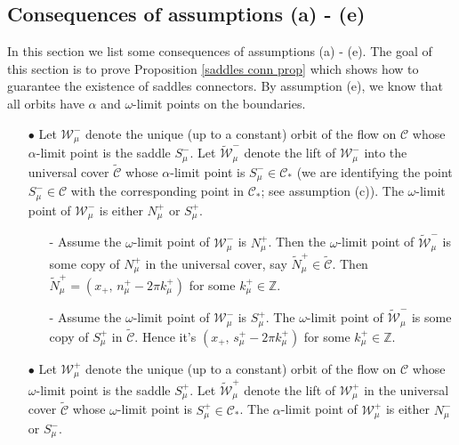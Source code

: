 \documentclass[11 pt]{article}
\renewcommand\({\left(}
\renewcommand\){\right)}
\newcommand\wt{\widetilde}
\newcommand\<{\langle}
\renewcommand\>{\rangle}
\newcommand\8{\infty}
\renewcommand\a{\alpha}
\newcommand{\mc}{\mathcal}
\newcommand{\Z}{\mathbb{Z}}
\begin{document}
\subsection{Consequences of assumptions (a) - (e)} 

\medskip
\medskip

In this section we list some consequences of assumptions (a) - (e). The goal of this section is to prove Proposition \ref{saddles conn prop} which shows how to guarantee the existence of saddles connectors. By assumption (e), we know that all orbits have $\a$ and $\omega$-limit points on the boundaries.

\medskip
\medskip

\begin{itemize}

\item [$\bullet$] Let $\mc{W}^-_\mu$ denote the unique (up to a constant) orbit of the flow on $\mc{C}$ whose $\alpha$-limit point is the saddle $S^-_\mu$.  
Let $\wt{\mc{W}}^-_\mu$ denote the lift of $\mc{W}^-_\mu$ into the universal cover $\wt{\mc{C}}$ whose $\a$-limit point is $S^-_\mu\in \mc{C}_*$ (we are identifying the point $S^-_\mu \in \mc{C}$ with the corresponding point in $\mc{C}_*$; see assumption (c)). The $\omega$-limit point of $\mc{W}^-_\mu$ is either $N^+_\mu$ or $S^+_\mu$. 

\smallskip
\begin{itemize}

\item[-] Assume the $\omega$-limit point of $\mc{W}^-_\mu$ is $N^+_\mu$. Then the $\omega$-limit point of $\wt{\mc{W}}^-_\mu$ is some copy of $N^+_\mu$ in the universal cover, say $\wt{N}^+_\mu \in \wt{\mc{C}}$. Then $\wt{N}^+_\mu = (x_+,\, n^+_\mu - 2\pi k^+_\mu)$ for some $k^+_\mu \in \Z$.  

\smallskip

\item[-] Assume the $\omega$-limit point of $\mc{W}^-_\mu$ is $S^+_\mu$. The $\omega$-limit point of $\wt{\mc{W}}^-_\mu$ is some copy of $S^+_\mu$ in $\wt{\mc{C}}$. Hence it's $(x_+, \, s^+_\mu - 2\pi k^+_\mu)$ for some $k^+_\mu \in \Z$.

\end{itemize}


 

\medskip

\item[$\bullet$] Let $\mc{W}^+_\mu$ denote the unique (up to a constant) orbit of the flow on $\mc{C}$ whose $\omega$-limit point is the saddle $S^+_\mu$. Let $\wt{\mc{W}}^+_\mu$ denote the lift of $\mc{W}_\mu^+$ in the universal cover $\wt{\mc{C}}$ whose $\omega$-limit point is $S^+_\mu \in \mc{C}_*$. The $\a$-limit point of $\mc{W}^+_\mu$ is either $N^-_\mu$ or $S^-_\mu$. 


\end{itemize}
\end{document}
